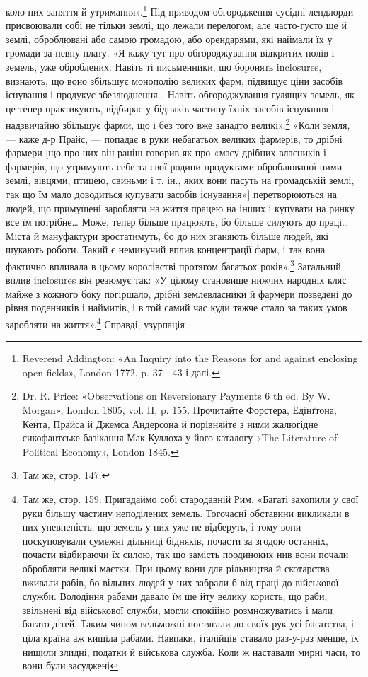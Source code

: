\parcont{}  %
коло них заняття й утримання».\footnote{
Reverend Addington: «An Inquiry into the Reasons for and against
enclosing open-fields», London 1772, p. 37—43 і далі.
} Під приводом обгородження
сусідні лендлорди присвоювали собі не тільки землі, що лежали
перелогом, але часто-густо ще й землі, оброблювані або самою
громадою, або орендарями, які наймали їх у громади за певну
плату. «Я кажу тут про обгороджування відкритих полів і земель,
уже оброблених. Навіть ті письменники, що боронять
inclosures, визнають, що воно збільшує монополію великих
фарм, підвищує ціни засобів існування і продукує збезлюднення\dots{}
Навіть обгороджування гулящих земель, як це тепер практикують,
відбирає у бідняків частину їхніх засобів існування і надзвичайно
збільшує фарми, що і без того вже занадто великі».\footnote{
Dr. R. Price: «Observations on Reversionary Payments 6 th ed.
By W. Morgan», London 1805, vol. II, p. 155. Прочитайте Форстера,
Едінґтона, Кента, Прайса й Джемса Андерсона й порівняйте з ними жалюгідне
сикофантське базікання Мак Куллоха у його каталогу «The
Literature of Political Economy», London 1845.
}
«Коли земля, — каже д-р Прайс, — попадає в руки небагатьох
великих фармерів, то дрібні фармери [що про них він раніш говорив
як про «масу дрібних власників і фармерів, що утримують
себе та свої родини продуктами оброблюваної ними землі, вівцями,
птицею, свиньми і т. ін., яких вони пасуть на громадській
землі, так що їм мало доводиться купувати засобів існування»]
перетворюються на людей, що примушені заробляти на життя
працею на інших і купувати на ринку все їм потрібне\dots{} Може,
тепер більше працюють, бо більше силують до праці\dots{} Міста й
мануфактури зростатимуть, бо до них зганяють більше людей,
які шукають роботи. Такий є неминучий вплив концентрації
фарм, і так вона фактично впливала в цьому королівстві протягом
багатьох років».\footnote{
Там же, стор. 147.
} Загальний вплив inclosures він резюмує
так: «У цілому становище нижчих народніх кляс майже з
кожного боку погіршало, дрібні землевласники й фармери позведені
до рівня поденників і наймитів, і в той самий час куди тяжче
стало за таких умов заробляти на життя».\footnote{
Там же, стор. 159. Пригадаймо собі стародавній Рим. «Багаті
захопили у свої руки більшу частину неподілених земель. Тогочасні
обставини викликали в них упевненість, що земель у них уже не відберуть,
і тому вони поскуповували сумежні дільниці бідняків, почасти за
згодою останніх, почасти відбираючи їх силою, так що замість поодиноких
нив вони почали обробляти великі маєтки. При цьому вони для
рільництва й скотарства вживали рабів, бо вільних людей у них забрали б
від праці до військової служби. Володіння рабами давало їм ше йту
велику користь, що раби, звільнені від військової служби, могли спокійно
розмножуватись і мали багато дітей. Таким чином вельможні постягали
до своїх рук усі багатства, і ціла країна аж кишіла рабами. Навпаки,
італійців ставало раз-у-раз менше, їх нищили злидні, податки й військова
служба. Коли ж наставали мирні часи, то вони були засуджені
} Справді, узурпація
